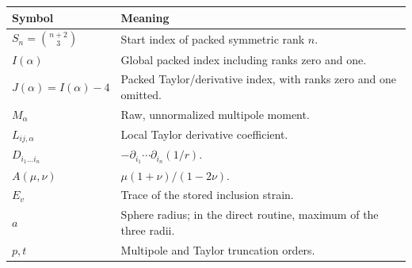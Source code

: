 \documentclass[11pt]{article}
\begin{document}
\begin{tabularx}{\textwidth}{@{}p{}Y@{}}
\toprule
Symbol & Meaning \\
\midrule
\(S_n=\binom{n+2}{3}\) & Start index of packed symmetric rank \(n\). \\
\(I(\alpha)\) & Global packed index including ranks zero and one. \\
\(J(\alpha)=I(\alpha)-4\) & Packed Taylor/derivative index, with ranks zero and one omitted. \\
\(M_\alpha\) & Raw, unnormalized multipole moment. \\
\(L_{ij,\alpha}\) & Local Taylor derivative coefficient. \\
\(D_{i_1\ldots i_n}\) & \(-\partial_{i_1}\cdots\partial_{i_n}(1/r)\). \\
\(A(\mu,\nu)\) & \(\mu(1+\nu)/(1-2\nu)\). \\
\(E_v\) & Trace of the stored inclusion strain. \\
\(a\) & Sphere radius; in the direct routine, maximum of the three radii. \\
\(p,t\) & Multipole and Taylor truncation orders. \\
\bottomrule
\end{tabularx}
\end{document}
